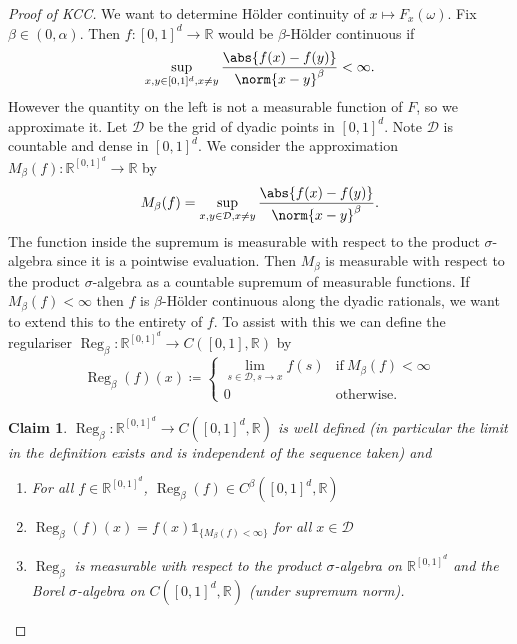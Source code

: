 \documentclass[fontsize=12pt, DIV=10]{scrreprt}
\newtheorem{claim}{Claim}
\theoremstyle{remark}
\newcommand{\defeq}{\coloneqq}
\newcommand{\R}{\mathbb R}
\newcommand{\indi}{\mathbb 1}
\newcommand{\calD}{\mathcal D}
\DeclareMathOperator{\reg}{Reg}
\newcommand{\boxspace}{\ensuremath{\R^{[0, 1]^d}}}
\newcommand{\unitbox}{\ensuremath{[0,1]^d}}
\begin{document}
\begin{proof}[Proof of KCC]
	We want to determine H\"older continuity of $x \mapsto F_{x}(\omega)$. Fix $\beta \in (0, \alpha)$. Then $f: \unitbox \to \R$ would be $\beta$-H\"older continuous if
	\begin{equation}
		\sup_{x, y \in [0, 1]^d, x \neq y} \frac{\abs{f(x) - f(y)}}{\norm{x - y}^{\beta}} < \infty.
	\end{equation}
	However the quantity on the left is not a measurable function of $F$, so we approximate it. Let $\calD$ be the grid of dyadic points in $[0, 1]^d$. Note $\calD$ is countable and dense in $[0, 1]^d$. We consider the approximation $M_{\beta}(f): \boxspace \to \R$ by
	\begin{equation}
		M_{\beta}(f) = \sup_{x, y \in \calD, x \neq y} \frac{\abs{f(x) - f(y)}}{\norm{x - y}^{\beta}}.
	\end{equation}
	The function inside the supremum is measurable with respect to the product $\sigma$-algebra since it is a pointwise evaluation. Then $M_{\beta}$ is measurable with respect to the product $\sigma$-algebra as a countable supremum of measurable functions. If $M_{\beta}(f) < \infty$ then $f$ is $\beta$-H\"older continuous along the dyadic rationals, we want to extend this to the entirety of $f$. To assist with this we can define the regulariser $\reg_{\beta}: \boxspace \to C([0, 1], \R)$ by
	\begin{equation}
		\reg_{\beta}(f)(x) \defeq 
		\begin{cases}
			\lim_{s \in \calD, s \to x} f(s) & \text{if}\ M_{\beta}(f) < \infty \\
			0 & \text{otherwise}.
		\end{cases}
	\end{equation}
	\newcommand{\regindi}{\ensuremath{\indi_{\{M_{\beta}(f) < \infty\}}}}
	\begin{claim}
		$\reg_{\beta}: \boxspace \to C([0, 1]^d, \R)$ is well defined (in particular the limit in the definition exists and is independent of the sequence taken) and 
		\begin{enumerate}
			\item For all $f \in \boxspace$, $\reg_{\beta}(f) \in C^{\beta}([0, 1]^d, \R)$
			\item $\reg_{\beta}(f)(x) = f(x) \regindi$ for all $x \in \calD$
			\item $\reg_{\beta}$ is measurable with respect to the product $\sigma$-algebra on $\boxspace$ and the Borel $\sigma$-algebra on $C([0, 1]^d, \R)$ (under supremum norm).
		\end{enumerate}
	\end{claim}

\end{proof}
\end{document}
